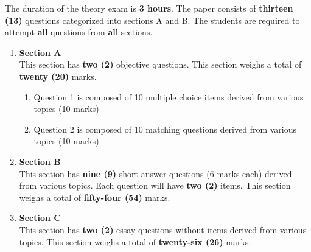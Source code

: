 \noindent The duration of the theory exam is \textbf{3 hours}. The paper consists of \textbf{thirteen (13)} questions categorized into sections A and B. The students are required to attempt \textbf{all} questions from \textbf{all} sections. 
\begin{enumerate}
	\item \textbf{Section A} \\
	This section has \textbf{two (2)} objective questions. This section weighs a total of \textbf{twenty (20)} marks.
	\begin{enumerate}
		\item Question 1 is composed of 10 multiple choice items derived from various topics (10 marks)
		\item Question 2 is composed of 10 matching questions derived from various topics (10 marks)
	\end{enumerate}
	
	\item \textbf{Section B} \\
	This section has \textbf{nine (9)} short answer questions (6 marks each) derived from various topics. Each question will have \textbf{two (2)} items. This section weighs a total of \textbf{fifty-four (54)} marks.
	
	\item \textbf{Section C} \\
	This section has \textbf{two (2)} essay questions without items derived from various topics. This section weighs a total of \textbf{twenty-six (26)} marks. 

\end{enumerate}
	
	
